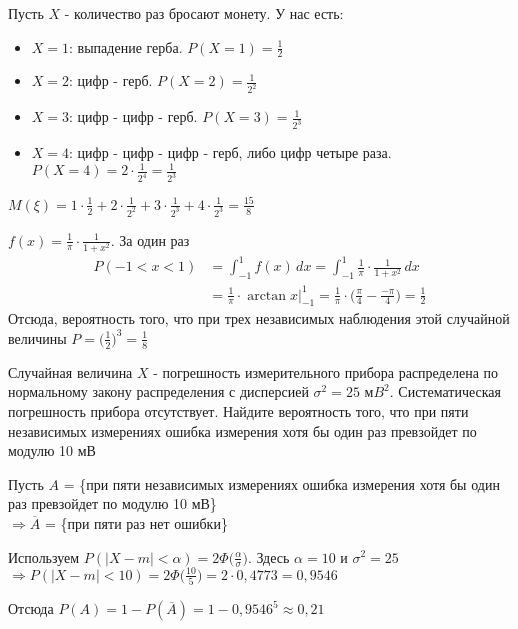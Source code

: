\begin{exercise}[8]
	Пусть $X$ - количество раз бросают монету. У нас есть:
	\begin{itemize}
		\item $X=1$: выпадение герба. $P(X=1) = \frac{1}{2}$
		\item $X=2$: цифр - герб. $P(X=2) = \frac{1}{2^2}$
		\item $X=3$: цифр - цифр - герб. $P(X=3) = \frac{1}{2^3}$
		\item $X=4$: цифр - цифр - цифр - герб, либо цифр четыре раза. \\ $P(X=4) = 2 \cdot \frac{1}{2^4} = \frac{1}{2^3}$
	\end{itemize}
	$M(\xi) = 1 \cdot \frac{1}{2} + 2 \cdot \frac{1}{2^2} + 3 \cdot \frac{1}{2^3} + 4 \cdot \frac{1}{2^3} = \frac{15}{8}$
\end{exercise}

\begin{exercise}[9]
	$f(x) = \frac{1}{\pi} \cdot \frac{1}{1+x^2}$. За один раз
	\begin{align*}
		P(-1 < x < 1) & = \int_{-1}^{1}f(x)\,dx = \int_{-1}^{1}\frac{1}{\pi} \cdot \frac{1}{1+x^2} \,dx \\ & = \frac{1}{\pi} \cdot \arctan x\Big|^{1}_{-1} = \frac{1}{\pi} \cdot \Big(\frac{\pi}{4} - \frac{-\pi}{4}\Big) = \frac{1}{2}
	\end{align*}
	Отсюда, вероятность того, что при трех независимых наблюдения этой случайной величины
	$P = \Big(\frac{1}{2}\Big)^3 = \frac{1}{8}$
\end{exercise}

\begin{exercise}[10] Случайная величина $X$ - погрешность измерительного прибора распределена по нормальному закону распределения с дисперсией $\sigma^2 = 25$ м$B^2$. Систематическая погрешность прибора отсутствует. Найдите вероятность того, что при пяти независимых измерениях ошибка измерения хотя бы один раз превзойдет по модулю 10 мВ
	
	Пусть $A$ = \{при пяти независимых измерениях ошибка измерения хотя бы один раз превзойдет по модулю 10 мВ\} \\ $\Rightarrow \overline{A}$ = \{при пяти раз нет ошибки\}
	
	Используем $P(|X - m| < \alpha) = 2 \Phi\Big(\frac{\alpha}{\sigma}\Big)$. Здесь $\alpha=10$ и $\sigma^2 = 25$ \\ $\Rightarrow P(|X-m| < 10) = 2 \Phi \Big(\frac{10}{5}\Big) = 2 \cdot 0,4773 = 0,9546$
	
	Отсюда $P(A) = 1 - P(\overline{A}) = 1 - 0,9546^5 \approx 0,21$
\end{exercise}

